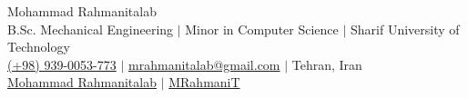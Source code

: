 \documentclass[a4paper,10pt]{article}
\begin{document}
	
	\begin{center}
		{\Calluna \fontsize{24pt}{26pt}\selectfont \textcolor{cvblue}{Mohammad Rahmanitalab}}\\[4pt]
		{\normalsize B.Sc. Mechanical Engineering \enspace $\mid$ \enspace Minor in Computer Science \enspace $\mid$ \enspace Sharif University of Technology}\\[5pt]
		{\small
			\href{tel:+989390053773}{\textcolor{cvblue}{\faPhone}\enspace (+98) 939-0053-773}
			\enspace $\mid$ \enspace
			\href{mailto:mrahmanitalab@gmail.com}{\textcolor{cvblue}{\faEnvelope}\enspace mrahmanitalab@gmail.com}
			\enspace $\mid$ \enspace
			\textcolor{cvblue}{\faMapMarker}\enspace Tehran, Iran
		}\\[2pt]
		{\small
			\href{https://www.linkedin.com/in/mohammad-rahmanitalab-336a95250}{\textcolor{cvblue}{\faLinkedinIn}\enspace Mohammad Rahmanitalab}
			\enspace $\mid$ \enspace
			\href{https://github.com/MRahmaniT}{\textcolor{cvblue}{\faGithub}\enspace MRahmaniT}
		}
	\end{center}
	\vspace{-20pt}
	
\end{document}
